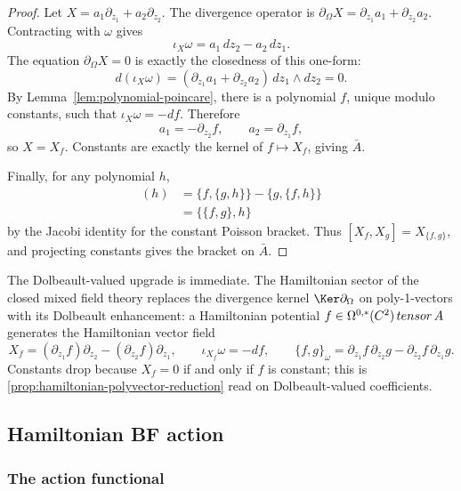 \documentclass[11pt]{memoir}
\begin{document}
\begin{proof}
  Let $X=a_1\partial_{z_1}+a_2\partial_{z_2}$. The divergence operator is
  $\partial_{\Omega}X=\partial_{z_1}a_1+\partial_{z_2}a_2$. Contracting with
  $\omega$ gives
  $$\iota_X\omega=a_1\,dz_2-a_2\,dz_1.$$
  The equation $\partial_{\Omega}X=0$ is exactly the closedness of this
  one-form:
  $$d(\iota_X\omega)
    =(\partial_{z_1}a_1+\partial_{z_2}a_2)\,dz_1\wedge dz_2=0.$$
  By Lemma~\ref{lem:polynomial-poincare}, there is a polynomial $f$, unique
  modulo constants, such that $\iota_X\omega=-df$. Therefore
  $$a_1=-\partial_{z_2}f,\qquad a_2=\partial_{z_1}f,$$
  so $X=X_f$. Constants are exactly the kernel of $f\mapsto X_f$, giving
  $\bar A$.

  Finally, for any polynomial $h$,
  \begin{align*}
  [X_f,X_g](h)
    &=\{f,\{g,h\}\}-\{g,\{f,h\}\}\\
    &=\{\{f,g\},h\}
  \end{align*}
  by the Jacobi identity for the constant Poisson bracket. Thus
  $[X_f,X_g]=X_{\{f,g\}}$, and projecting constants gives the bracket on
  $\bar A$.
\end{proof}

The Dolbeault-valued upgrade is immediate. The Hamiltonian sector of the closed
mixed field theory replaces the divergence kernel $\Ker\partial_\Omega$ on
poly-1-vectors with its Dolbeault enhancement: a Hamiltonian potential
$f\in\Omega^{0,*}(C^2)\,tensor\,A$ generates the Hamiltonian
vector field
$$X_f=(\partial_{z_1}f)\partial_{z_2}-(\partial_{z_2}f)\partial_{z_1},
  \qquad \iota_{X_f}\omega=-df,
  \qquad \{f,g\}_\omega=
    \partial_{z_1}f\,\partial_{z_2}g-\partial_{z_2}f\,\partial_{z_1}g.$$
Constants drop because $X_f=0$ if and only if $f$ is constant; this is
\ref{prop:hamiltonian-polyvector-reduction} read on Dolbeault-valued
coefficients.

\subsection{Hamiltonian BF action}

\subsubsection{The action functional}
\end{document}

